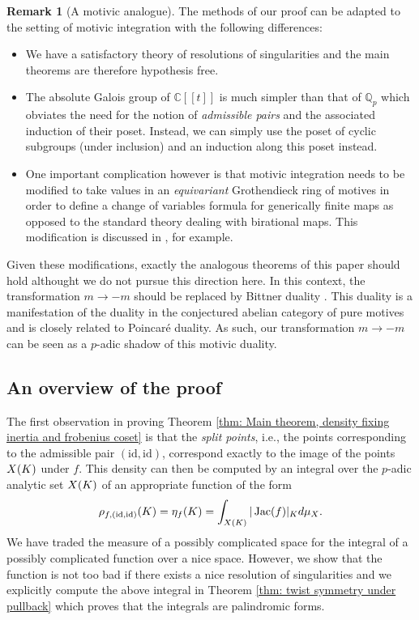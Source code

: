 \documentclass[10pt]{article}
\theoremstyle{plain}
\theoremstyle{definition}
\newtheorem{remark}[theorem]{Remark}
\numberwithin{equation}{section}
\begin{document}
\begin{remark}[A motivic analogue]\label{rmk: motivic duality}
The methods of our proof can be adapted to the setting of motivic integration with the following differences:
\begin{itemize}
    \item We have a satisfactory theory of resolutions of singularities and the main theorems are therefore hypothesis free.
    \item The absolute Galois group of $\mathbb C[\![t]\!]$ is much simpler than that of $\mathbb Q_p$ which obviates the need for the notion of \emph{admissible pairs} and the associated induction of their poset. Instead, we can simply use the poset of cyclic subgroups (under inclusion) and an induction along this poset instead.
    \item One important complication however is that motivic integration needs to be modified to take values in an \emph{equivariant} Grothendieck ring of motives in order to define a change of variables formula for generically finite maps as opposed to the standard theory dealing with birational maps. This modification is discussed in \cite[\S2.1]{carvajal2021behavior}, for example.
\end{itemize}
Given these modifications, exactly the analogous theorems of this paper should hold althought we do not pursue this direction here. In this context, the transformation $m \to -m$ should be replaced by Bittner duality \cite[Corollary 3.4]{bittner2004universal}. This duality is a manifestation of the duality in the conjectured abelian category of pure motives and is closely related to Poincar\'e duality. As such, our transformation $m \to -m$ can be seen as a $p$-adic shadow of this motivic duality. 
\end{remark}


\subsection{An overview of the proof}


The first observation in proving Theorem \ref{thm: Main theorem, density fixing inertia and frobenius coset} is that the \emph{split points}, i.e., the points corresponding to the admissible pair $(\mathrm{id},\mathrm{id})$, correspond exactly to the image of the points $X(K)$ under $f$. This density can then be computed by an integral over the $p$-adic analytic set $X(K)$ of an appropriate function of the form
\[\rho_{f,(\mathrm{id},\mathrm{id})}(K) = \eta_f(K) = \int_{X(K)}|\operatorname{Jac}(f)|_{K}d\mu_{X}.\]
We have traded the measure of a possibly complicated space for the integral of a possibly complicated function over a nice space. However, we show that the function is not too bad if there exists a nice resolution of singularities and we explicitly compute the above integral in Theorem \ref{thm: twist symmetry under pullback} which proves that the integrals are palindromic forms.
\end{document}
